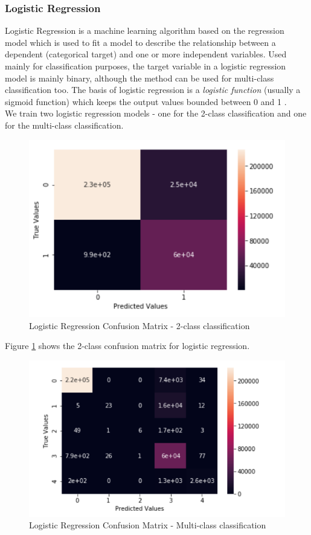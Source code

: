 \subsubsection{Logistic Regression}
Logistic Regression is a machine learning algorithm based on the regression model which is used to fit a model to describe the relationship between a dependent (categorical target) and one or more independent variables. Used mainly for classification purposes, the target variable in a logistic regression model is mainly binary, although the method can be used for multi-class classification too. The basis of logistic regression is a {\em logistic function} (usually a sigmoid function) which keeps the output values bounded between 0 and 1   \cite{islr09}.\\
We train two logistic regression models - one for the 2-class classification and one for the multi-class classification. 
\begin{figure}
	\includegraphics[width=1.0\columnwidth]{images/logreg2.PNG}
	\caption{Logistic Regression Confusion Matrix - 2-class classification}
	\label{F:logreg2}
\end{figure}
Figure \ref{F:logreg2} shows the 2-class confusion matrix for logistic regression.
\begin{figure}
	\includegraphics[width=1.0\columnwidth]{images/logregall.PNG}
	\caption{Logistic Regression Confusion Matrix - Multi-class classification}
	\label{F:logregall}
\end{figure}
